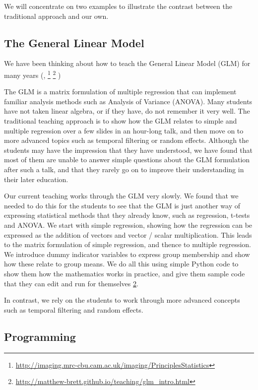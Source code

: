 We will concentrate on two examples to illustrate the contrast between the
traditional approach and our own.

\subsection{The General Linear Model}

We have been thinking about how to teach the General Linear Model (GLM) for
many years
(\citealt{poline2012general},
\footnote{\url{http://imaging.mrc-cbu.cam.ac.uk/imaging/PrinciplesStatistics}}
\footnote{\label{glm_intro}
    \url{http://matthew-brett.github.io/teaching/glm_intro.html}}
    )

The GLM is a matrix formulation of multiple regression that can implement
familiar analysis methods such as Analysis of Variance (ANOVA).  Many students
have not taken linear algebra, or if they have, do not remember it very well.
The traditional teaching approach is to show how the GLM relates to simple and
multiple regression over a few slides in an hour-long talk, and then move on
to more advanced topics such as temporal filtering or random effects.
Although the students may have the impression that they have understood, we
have found that most of them are unable to answer simple questions about the
GLM formulation after such a talk, and that they rarely go on to improve their
understanding in their later education.

Our current teaching works through the GLM very slowly. We found that we
needed to do this for the students to see that the GLM is just another way of
expressing statistical methods that they already know, such as regression,
t-tests and ANOVA.  We start with simple regression, showing how the
regression can be expressed as the addition of vectors and vector / scalar
multiplication.  This leads to the matrix formulation of simple regression,
and thence to multiple regression.  We introduce dummy indicator variables to
express group membership and show how these relate to group means.  We do all
this using simple Python code to show them how the mathematics works in
practice, and give them sample code that they can edit and run for themselves
\cref{glm_intro}.

In contrast, we rely on the students to work through more advanced concepts
such as temporal filtering and random effects.

\subsection{Programming}

